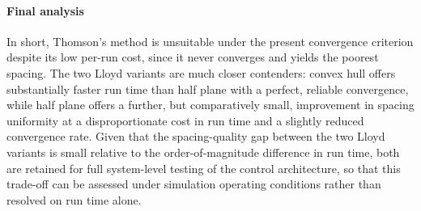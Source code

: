 \paragraph{Final analysis} In short, Thomson's method is unsuitable under the present convergence criterion despite its low per-run cost, since it never converges and yields the poorest spacing. The two Lloyd variants are much closer contenders: convex hull offers substantially faster run time than half plane with a perfect, reliable convergence, while half plane offers a further, but comparatively small, improvement in spacing uniformity at a disproportionate cost in run time and a slightly reduced convergence rate. Given that the spacing-quality gap between the two Lloyd variants is small relative to the order-of-magnitude difference in run time, both are retained for full system-level testing of the control architecture, so that this trade-off can be assessed under simulation operating conditions rather than resolved on run time alone.
